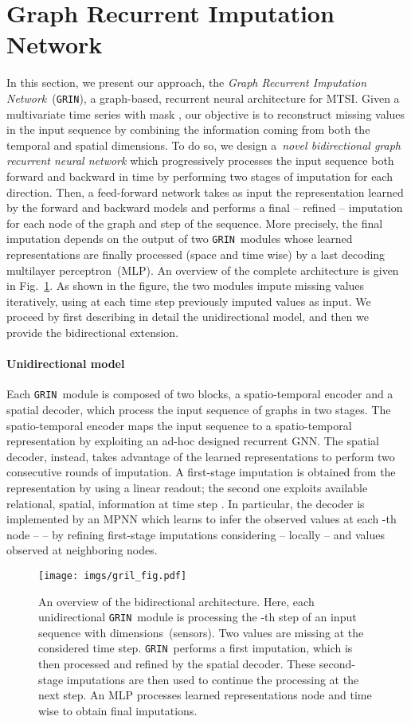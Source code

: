 \documentclass{article} \usepackage{iclr2022_conference,times}
\newcommand{\GRIL}{\texttt{GRIN}}
\begin{document}
\section{Graph Recurrent Imputation Network}\label{s:proposal}

In this section, we present our approach, the \emph{Graph Recurrent Imputation Network}~(\GRIL), a graph-based, recurrent neural architecture for MTSI. Given a multivariate time series  with mask , our objective is to reconstruct missing values in the input sequence by combining the information coming from both the temporal and spatial dimensions. To do so, we design a~\emph{novel bidirectional graph recurrent neural network} which progressively processes the input sequence both forward and backward in time by performing two stages of imputation for each direction. Then, a feed-forward network takes as input the representation learned by the forward and backward models and performs a final -- refined -- imputation for each node of the graph and step of the sequence. More precisely, the final imputation depends on the output of two \GRIL\ modules whose learned representations are finally processed (space and time wise) by a last decoding multilayer perceptron~(MLP). An overview of the complete architecture is given in Fig.~\ref{fig:grill}. As shown in the figure, the two modules impute missing values iteratively, using at each time step previously imputed values as input. We proceed by first describing in detail the unidirectional model, and then we provide the bidirectional extension.

\paragraph{Unidirectional model} Each \GRIL\ module is composed of two blocks, a spatio-temporal encoder and a spatial decoder, which process the input sequence of graphs in two stages. The spatio-temporal encoder maps the input sequence  to a spatio-temporal representation  by exploiting an ad-hoc designed recurrent GNN. The spatial decoder, instead, takes advantage of the learned representations to perform two consecutive rounds of imputation.  A first-stage imputation is obtained from the representation by using a linear readout; the second one exploits available relational, spatial, information at time step . In particular, the decoder is implemented by an MPNN which learns to infer the observed values at each -th node --  -- by refining first-stage imputations considering -- locally --  and values observed at neighboring nodes.
\begin{figure}
    \centering
    \texttt{[image: imgs/gril\_fig.pdf]}
    \vspace{-0.75cm}
    \caption{An overview of the bidirectional architecture. Here, each unidirectional \GRIL\ module is processing the -th step of an input sequence with  dimensions~(sensors). Two values are missing at the considered time step. \GRIL\ performs a first imputation, which is then processed and refined by the spatial decoder. These second-stage imputations are then used to continue the processing at the next step. An MLP processes learned representations node and time wise to obtain final imputations.}
    \label{fig:grill}
\end{figure}
\end{document}
